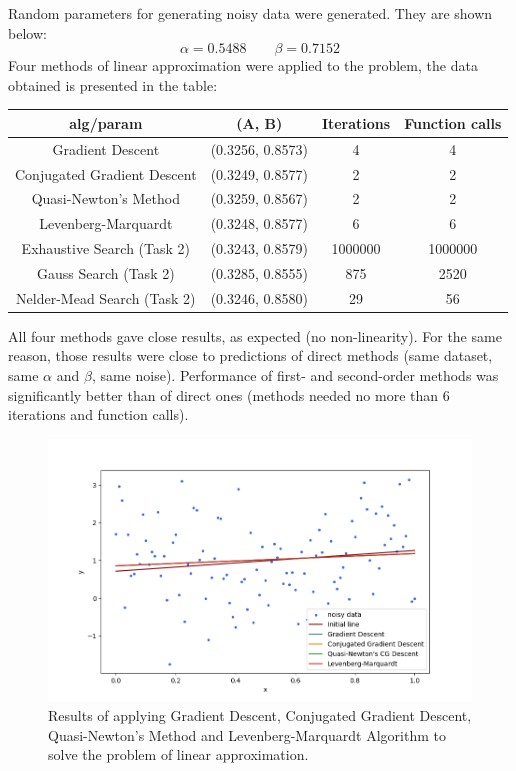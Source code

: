 \documentclass[12pt, a4paper]{article}
\begin{document}
Random parameters for generating noisy data were generated. They are shown below:
\[ \alpha = 0.5488 \qquad \beta = 0.7152 \]
Four methods of linear approximation were applied to the problem, the data obtained is presented in the table:
\begin{center}
\begin{tabular}{cccc}
\hline
alg/param                   & (A, B)           & Iterations & Function calls \\ \hline
Gradient Descent            & (0.3256, 0.8573) & 4          & 4              \\
Conjugated Gradient Descent & (0.3249, 0.8577) & 2          & 2              \\
Quasi-Newton's Method       & (0.3259, 0.8567) & 2          & 2              \\
Levenberg-Marquardt         & (0.3248, 0.8577) & 6          & 6              \\ \hline
Exhaustive Search (Task 2)  & (0.3243, 0.8579) & 1000000    & 1000000        \\
Gauss Search (Task 2)       & (0.3285, 0.8555) & 875        & 2520           \\
Nelder-Mead Search (Task 2) & (0.3246, 0.8580) & 29         & 56             \\ \hline
\end{tabular}
\end{center}
All four methods gave close results, as expected (no non-linearity). For the same reason, those results were close to predictions of direct methods (same dataset, same $\alpha$ and $\beta$, same noise). Performance of first- and second-order methods was significantly better than of direct ones (methods needed no more than 6 iterations and function calls).

\begin{figure}[!h]
\centering
\includegraphics[width=\textwidth]{line.png}
\caption{Results of applying Gradient Descent, Conjugated Gradient Descent, Quasi-Newton's Method and Levenberg-Marquardt Algorithm to solve the problem of linear approximation.}
\end{figure}
\end{document}
